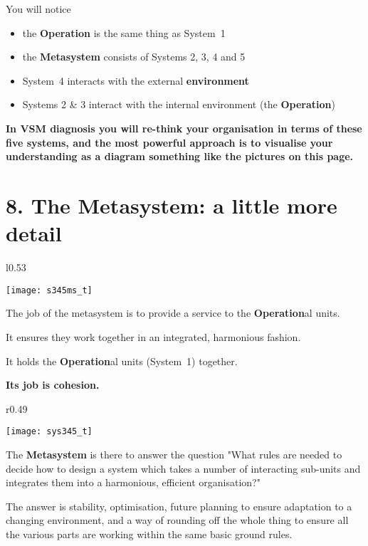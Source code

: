 You will notice
\begin{itemize}
	\item the \textcolor{O}{\textbf{Operation}} is the same thing as System 1
	\item the \textcolor{M}{\textbf{Metasystem}} consists of Systems 2, 3, 4 and 5
	\item System 4 interacts with the external \textcolor{E}{\textbf{environment}}
	\item Systems 2 \& 3 interact with the internal environment (the \textcolor{O}{\textbf{Operation}})
\end{itemize}


\textbf{In VSM diagnosis you will re-think your organisation in terms of these five systems, and the most powerful approach is to visualise your understanding as a diagram something like the pictures on this page.}

\section*{8. The \textcolor{M}{\textbf{Metasystem}}: a little more detail}
\begin{wrapfigure}[9]{l}{0.53\textwidth}
    \begin{center}
        \texttt{[image: s345ms\_t]}
    \end{center}
\end{wrapfigure}
The job of the metasystem is to provide a service to the \textcolor{O}{\textbf{Operation}}al units.

It ensures they work together in an integrated, harmonious fashion.

It holds the \textcolor{O}{\textbf{Operation}}al units (System 1) together.

\textbf{Its job is cohesion.}
\vspace{2cm}

\begin{wrapfigure}[15]{r}{0.49\textwidth}
    \begin{center}
        \texttt{[image: sys345\_t]}
    \end{center}
\end{wrapfigure}

The \textcolor{M}{\textbf{Metasystem}} is there to answer the question "What rules are needed to decide how to design a system which takes a number of interacting sub-units and integrates them into a harmonious, efficient organisation?"

The answer is stability, optimisation, future planning to ensure adaptation to a changing environment, and a way of rounding off the whole thing to ensure all the various parts are working within the same basic ground rules.

